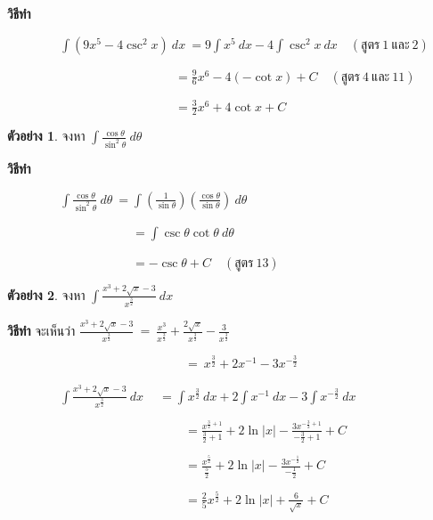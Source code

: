 \documentclass[
]{book}
\theoremstyle{definition}
\theoremstyle{definition}
\newtheorem{example}{ตัวอย่าง}[chapter]
\theoremstyle{definition}
\theoremstyle{definition}
\theoremstyle{remark}
\begin{document}
\textbf{วิธีทำ}

\(\qquad \qquad \ \displaystyle \int (9x^{5}-4 \csc^{2} x) \ dx \ = 9\int
x^{5} \ dx -4 \int \csc^{2} x \ dx \quad ( \mbox{สูตร} \ 1 \ \mbox{และ} \ 
2)\)

\(\qquad \qquad \qquad \qquad \qquad \qquad \quad \ \ =\displaystyle
\frac{9}{ 6}x^{6} -4(-\cot x)+C \quad ( \mbox{สูตร} \ 4 \ \mbox{และ} \ 11)\)

\(\qquad \qquad \qquad \qquad \qquad \qquad \quad \ \ =\displaystyle
\frac{3}{2}x^{6}+4\cot x+C\)

\begin{example}
จงหา \(\displaystyle \int \frac{\cos \theta}{\sin^{2} \theta}
\ d\theta\)
\end{example}

\textbf{วิธีทำ}

\(\qquad \qquad \ \displaystyle \int \frac{\cos \theta}{\sin^{2} \theta} \ 
d\theta \ = \int \left(\frac{1}{\sin \theta}\right) \left(\frac{\cos
\theta}{\sin \theta}\right) \ d\theta\)

\(\qquad \qquad \qquad \qquad \qquad = \displaystyle \int \csc \theta \cot
\theta \ d\theta\)

\(\qquad \qquad \qquad \qquad \qquad = \displaystyle -\csc \theta +C \quad (
\mbox{สูตร} \ 13)\)

\begin{example}
จงหา \(\displaystyle \int
\frac{x^{3}+2\sqrt{x}-3}{x^{\frac{3}{2}}} \ dx\)
\end{example}

\textbf{วิธีทำ} จะเห็นว่า \(\displaystyle
\frac{x^{3}+2\sqrt{x}-3}{x^{\frac{3}{2}}} \ = \ 
\frac{x^{3}}{x^{\frac{3}{2}}}+\frac{2\sqrt{x}}{x^{\frac{3}{2}}}-\frac{3}{x^{\frac{3}{2}}}\)

\(\qquad \qquad \qquad \qquad \qquad \qquad \qquad \ = \ 
x^{\frac{3}{2}}+2x^{-1}-3x^{-\frac{3}{2}}\)

\(\qquad \qquad\ \displaystyle \int \frac{x^{3}+2\sqrt{x}-3}{x^{\frac{3}{2}}}
\ dx \quad \ = \int x^{\frac{3}{2}} \ dx +2 \int x^{-1} \ dx -3 \int
x^{-\frac{3}{2}} \ dx\)

\(\qquad \qquad \qquad \qquad \qquad \qquad \qquad \ =\displaystyle
\frac{x^{\frac{3}{2}+1}}{\frac{3}{2}+1}  + 2 \ln |x|
-\frac{3x^{-\frac{3}{2}+1}}{-\frac{3}{2}+1} + C\)

\(\qquad \qquad \qquad \qquad \qquad \qquad \qquad \ =\displaystyle
\frac{x^{\frac{5}{2}}}{\frac{5}{2}} + 2 \ln
|x|-\frac{3x^{-\frac{1}{2}}}{-\frac{1}{2}}+ C\)

\(\qquad \qquad \qquad \qquad \qquad \qquad \qquad \ =\displaystyle
\frac{2}{5}x^{\frac{5}{2}}+ 2 \ln |x|+\frac{6}{\sqrt{x}}+ C\)
\end{document}
